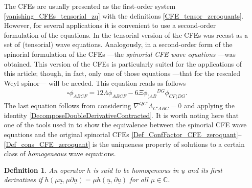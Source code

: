 \documentclass[10pt,a4paper]{article}
\theoremstyle{plain}
\newtheorem*{definition}{Definition}
\newcounter{mnotecount}%
\newcommand{\mnotex}[1]%
{\protect{\stepcounter{mnotecount}}$^{\mbox{\footnotesize $\bullet$\themnotecount}}$ 
\marginpar{%
\raggedright\tiny\em
$\!\!\!\!\!\!\,\bullet$\themnotecount: #1} }
\begin{document}
The CFEs are usually presented as the first-order system
\eqref{vanishing_CFEs_tensorial_zq} with the definitions
\eqref{CFE_tensor_zeroquants}. However, for several applications it is
convenient to use a second-order formulation of the equations. In
\cite{Pae13} the tensorial version of the CFEs was recast as a set of
(tensorial) wave equations.  Analogously, in \cite{GasVal15} a
second-order form of the spinorial formulation of the CFEs ---the
\emph{spinorial CFE wave equations} ---was obtained.  This version of
the CFEs is particularly suited for the applications of this article;
though, in fact, only one of those equations ---that for the rescaled
Weyl spinor--- will be needed.
This equation reads as follows
\begin{eqnarray}
  \square \phi _{ABCF} = 12 \Lambda \phi _{ABCF} -6 \Xi \phi
  _{(AB}{}^{DG}\phi _{CF)DG}.
  \label{Wave_eq_CFE_Weyl}
\end{eqnarray}
The last equation follows from considering $\nabla^{QC'}\Lambda
_{C'ABC}=0$ and applying the identity
\eqref{DecomposeDoubleDerivativeContracted}.
It is worth noting here that one of the tools used in \cite{GasVal15}
to show the equivalence between the spinorial CFE wave equations and
the original spinorial CFEs
\eqref{Def_ConfFactor_CFE_zeroquant}--\eqref{Def_cons_CFE_zeroquant}
is the uniqueness property of solutions to a certain class of \textit{homogeneous} wave
equations. 

\begin{definition}
{\em An operator $h$ is said to be \textit{homogeneous in} $\underline{u}$
\textit{and its first derivatives} if
$h (\mu\underline{u},\mu\partial\underline{u})=\mu
h(\underline{u}, \partial\underline{u})$ for all
$\mu\in\mathbb{C}$. }
\end{definition}
\end{document}
